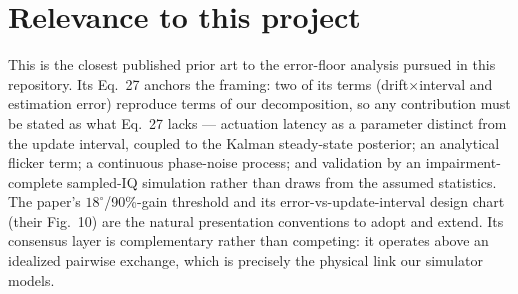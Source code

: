 \documentclass[10pt]{article}
\begin{document}
\section{Relevance to this project}
This is the closest published prior art to the error-floor analysis pursued
in this repository. Its Eq.~27 anchors the framing: two of its terms
(drift$\times$interval and estimation error) reproduce terms of our
decomposition, so any contribution must be stated as what Eq.~27 lacks ---
actuation latency as a parameter distinct from the update interval, coupled
to the Kalman steady-state posterior; an analytical flicker term; a
continuous phase-noise process; and validation by an impairment-complete
sampled-IQ simulation rather than draws from the assumed statistics. The
paper's $18^\circ$/90\%-gain threshold and its error-vs-update-interval
design chart (their Fig.~10) are the natural presentation conventions to
adopt and extend. Its consensus layer is complementary rather than
competing: it operates above an idealized pairwise exchange, which is
precisely the physical link our simulator models.
\end{document}
